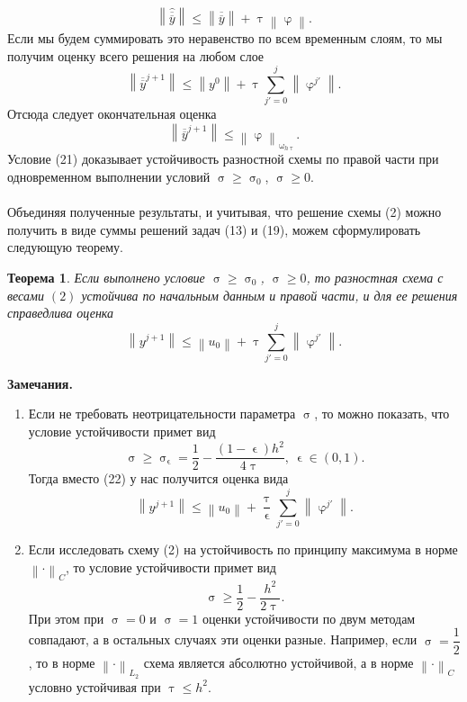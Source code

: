 \documentclass[a4paper, 12pt]{report}
\numberwithin{equation}{section}
\newcommand{\ol}{\overline}
\renewcommand{\leq}{\leqslant}
\renewcommand{\geq}{\geqslant}
\renewcommand{\varphi}{\upvarphi}
\renewcommand{\phi}{\upvarphi}
\renewcommand{\tau}{\uptau}
\renewcommand{\sigma}{\upsigma}
\renewcommand{\omega}{\upomega}
\renewcommand{\epsilon}{\upvarepsilon}
\newcommand\Norm[1]{\left\| #1 \right\|}
\newtheorem*{theorem}{Теорема}
\begin{document}
	$$\Norm {\hat{\ol{\ol y}}}\leq\Norm{\ol{\ol y}} + \tau \Norm{\varphi}.$$
	Если мы будем суммировать это неравенство по всем временным слоям, то мы получим оценку всего решения на любом слое 
	$$\Norm{\ol{\ol {y}}^{j+1}} \leq \Norm{y^0} + \tau \sum_{j'= 0}^j \Norm{\phi^{j'}}.$$
	Отсюда следует окончательная оценка
	\begin{equation}
		\Norm{\ol{\ol {y}}^{j+1}}\leq \Norm{\phi}_{\omega _{h\tau}}.
	\end{equation}
	Условие (21) доказывает устойчивость разностной схемы по правой части при одновременном выполнении условий $\sigma \geq \sigma_0$, $\sigma \geq 0$. \\\\
	Объединяя полученные результаты, и учитывая, что решение схемы (2) можно получить в виде суммы решений задач (13) и (19), можем сформулировать следующую теорему.
	\begin{theorem}
		Если выполнено условие $\sigma \geq \sigma_0$, $\sigma \geq 0$, то разностная схема с весами $(2)$ устойчива по начальным данным и правой части, и для ее решения справедлива оценка
		\begin{equation}
			\Norm{y^{j+1}}\leq \Norm{u_0} + \tau \sum_{j'=0}^j \Norm{\phi^{j'}}.
		\end{equation}
	\end{theorem}
	\textbf{Замечания.} \begin{enumerate}
		\item Если не требовать неотрицательности параметра $\sigma$, то можно показать, что условие устойчивости примет вид
	\begin{equation}
		\sigma \geq \sigma _\epsilon = \dfrac 12 - \dfrac{(1-\epsilon) h^2}{4\tau},\ \epsilon \in (0,1).
	\end{equation}
	Тогда вместо (22) у нас получится оценка вида
	\begin{equation}
		\Norm{y^{j+1}} \leq \Norm{u_0} + \dfrac \tau \epsilon \sum_{j'=0}^j \Norm{\phi^{j'}}.
	\end{equation}
	\item Если исследовать схему (2) на устойчивость по принципу максимума в норме $\Norm{\cdot}_C$, то условие устойчивости примет вид \begin{equation}
		\sigma \geq \dfrac 12 - \dfrac{h^2}{2\tau}.
	\end{equation}
	При этом при $\sigma = 0$ и $\sigma = 1$ оценки устойчивости по двум методам совпадают, а в остальных случаях эти оценки разные. Например, если $\sigma = \dfrac 12$, то в норме $\Norm{\cdot }_{L_2}$ схема является абсолютно устойчивой, а в норме $\Norm{\cdot }_C$ условно устойчивая при $\tau \leq h^2$.
	\end{enumerate}
\end{document}
